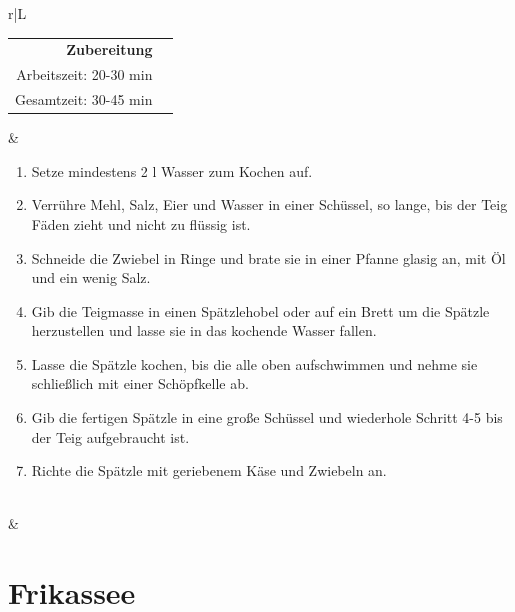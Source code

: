 \documentclass[a4paper, 12pt]{scrbook} 								%
\numberwithin{equation}{section} 									%
\begin{document}
	\begin{tabularx}{\textwidth}{r|L}

		\begin{tabular}[t]{rr}
			\textbf{Zubereitung}	\\
			Arbeitszeit: 20-30 min	\\
			Gesamtzeit:	30-45 min	\\
		\end{tabular}			&	\begin{enumerate}[]
										\item Setze mindestens 2 l Wasser zum Kochen auf.
										\item Verrühre Mehl, Salz, Eier und Wasser in einer Schüssel, so lange, bis der Teig Fäden zieht und nicht zu flüssig ist.
										\item Schneide die Zwiebel in Ringe und brate sie in einer Pfanne glasig an, mit Öl und ein wenig Salz.
										\item Gib die Teigmasse in einen Spätzlehobel oder auf ein Brett um die Spätzle herzustellen und lasse sie in das kochende Wasser fallen.
										\item Lasse die Spätzle kochen, bis die alle oben aufschwimmen und nehme sie schließlich mit einer Schöpfkelle ab.
										\item Gib die fertigen Spätzle in eine große Schüssel und wiederhole Schritt 4-5 bis der Teig aufgebraucht ist.
										\item Richte die Spätzle mit geriebenem Käse und Zwiebeln an.
									\end{enumerate}	\\
								&	\\
	\end{tabularx}
	\newpage


	\section{Frikassee}	\label{frikassee}
\end{document}
